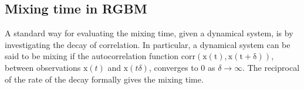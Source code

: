 \documentclass[11pt]{article}
\numberwithin{equation}{section}
\begin{document}

\subsection{Mixing time in RGBM}

A standard way for evaluating the mixing time, given a dynamical system, is by investigating the decay of correlation. In particular, a dynamical system can be said to be mixing if the autocorrelation function $\mathrm{corr(\mathrm{x}(t), \mathrm{x}(t+\delta))}$, between observations $\mathrm{x}(t)$ and $\mathrm{x}(t\delta)$, converges to $0$ as $\delta \to \infty$. The reciprocal of the rate of the decay formally gives the mixing time.
\end{document}
